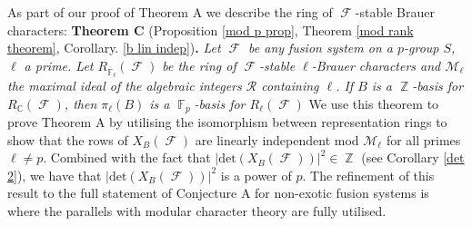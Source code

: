 \documentclass[12pt]{article}
\DeclareMathOperator{\C}{\mathbb{C}}
\DeclareMathOperator{\F}{\mathbb{F}}
\DeclareMathOperator{\Z}{\mathbb{Z}}
\DeclareMathOperator{\sF}{\mathcal{F}}
\theoremstyle{plain}
\theoremstyle{definition}
\begin{document}
As part of our proof of Theorem A we describe the ring of $\sF$-stable Brauer characters:\newline\newline
\textbf{Theorem C} (Proposition \ref{mod p prop}, Theorem \ref{mod rank theorem}, Corollary. \ref{b lin indep})\textbf{.}
\emph{Let $\sF$ be any fusion system on a $p$-group $S$, $\ell$ a prime. Let $R_{\overline{\F}_{\ell}}(\sF)$ be the ring of $\sF$-stable $\ell$-Brauer characters and $\mathcal{M}_{\ell}$ the maximal ideal of the algebraic integers $\mathcal{R}$ containing $\ell$. If $B$ is a $\Z$-basis for $R_{\C}(\sF)$, then $\pi_{\ell}(B)$ is a $\F_p$-basis for $R_{\ell}(\sF)$ }
\newline\newline
We use this theorem to prove Theorem A by utilising the isomorphism between representation rings to show that the rows of $X_B(\sF)$ are linearly independent mod $\mathcal{M}_{\ell}$ for all primes $\ell \neq p$.
Combined with the fact that $|\mathrm{det}(X_B(\sF))|^2 \in \Z$ (see Corollary \ref{det 2}), we have that $|\mathrm{det}(X_B(\sF))|^2$ is a power of $p$.
The refinement of this result to the full statement of Conjecture A for non-exotic fusion systems is where the parallels with modular character theory are fully utilised. 
\end{document}
